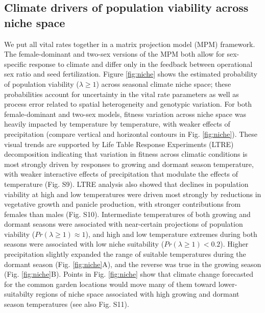 \documentclass[9pt,twocolumn,twoside,lineno]{pnas-new}
\begin{document}
\subsection*{Climate drivers of population viability across niche space}
We put all vital rates together in a  matrix projection model (MPM) framework. 
The female-dominant  and two-sex versions of the MPM  both allow for sex-specific  response to climate and differ only in the feedback between  operational sex ratio and seed fertilization.
Figure \ref{fig:niche} shows the estimated probability of population viability ($\lambda \ge 1$) across seasonal climate niche space; these probabilities account for uncertainty in the vital rate parameters as well as process error related to spatial heterogeneity and genotypic variation. 
For both female-dominant and two-sex models, fitness variation across niche space was  heavily impacted by temperature by temperature, with weaker effects of precipitation (compare vertical and horizontal contours in Fig. \ref{fig:niche}). 
These visual trends are supported by Life Table Response Experiments (LTRE) decomposition indicating that variation in fitness across climatic conditions is most strongly driven by responses to growing and dormant season temperature, with weaker interactive effects of precipitation that modulate the effects of temperature (Fig. S9). 
LTRE analysis also showed that declines in population viability at high and low temperatures were driven most strongly by reductions in vegetative growth and panicle production, with stronger contributions from females than males (Fig. S10). 
Intermediate temperatures of both growing and dormant seasons were associated with near-certain projections of population viability ($Pr(\lambda \ge 1) \approx 1$), and high and low temperature extremes during both seasons were associated with low niche suitability ($Pr(\lambda \ge 1) < 0.2$). 
Higher precipitation slightly expanded the range of suitable temperatures during the dormant season (Fig. \ref{fig:niche}A), and the reverse was true in the growing season (Fig. \ref{fig:niche}B). 
Points in Fig. \ref{fig:niche} show that climate change forecasted for the common garden locations would move many of them toward lower-suitabilty regions of niche space associated with high growing and dormant season temperatures (see also Fig. S11).
\end{document}
